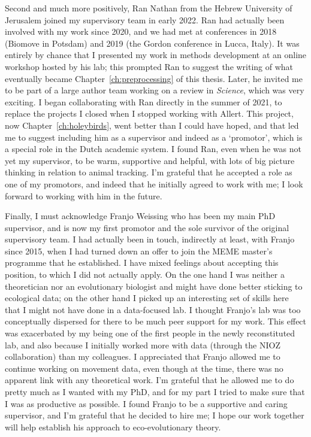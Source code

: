 Second and much more positively, Ran Nathan from the Hebrew University of Jerusalem joined my supervisory team in early 2022.
Ran had actually been involved with my work since 2020, and we had met at conferences in 2018 (Biomove in Potsdam) and 2019 (the Gordon conference in Lucca, Italy).
It was entirely by chance that I presented my work in methods development at an online workshop hosted by his lab; this prompted Ran to suggest the writing of what eventually became Chapter~\ref{ch:preprocessing} of this thesis.
Later, he invited me to be part of a large author team working on a review in \textit{Science}, which was very exciting.
I began collaborating with Ran directly in the summer of 2021, to replace the projects I closed when I stopped working with Allert.
This project, now Chapter~\ref{ch:holeybirds}, went better than I could have hoped, and that led me to suggest including him as a supervisor and indeed as a `promotor', which is a special role in the Dutch academic system.
I found Ran, even when he was not yet my supervisor, to be warm, supportive and helpful, with lots of big picture thinking in relation to animal tracking.
I'm grateful that he accepted a role as one of my promotors, and indeed that he initially agreed to work with me; I look forward to working with him in the future.

Finally, I must acknowledge Franjo Weissing who has been my main PhD supervisor, and is now my first promotor and the sole survivor of the original supervisory team.
I had actually been in touch, indirectly at least, with Franjo since 2015, when I had turned down an offer to join the MEME master's programme that he established.
I have mixed feelings about accepting this position, to which I did not actually apply.
On the one hand I was neither a theoretician nor an evolutionary biologist and might have done better sticking to ecological data; on the other hand I picked up an interesting set of skills here that I might not have done in a data-focused lab.
I thought Franjo's lab was too conceptually dispersed for there to be much peer support for my work.
This effect was exacerbated by my being one of the first people in the newly reconstituted lab, and also because I initially worked more with data (through the NIOZ collaboration) than my colleagues.
I appreciated that Franjo allowed me to continue working on movement data, even though at the time, there was no apparent link with any theoretical work.
I'm grateful that he allowed me to do pretty much as I wanted with my PhD, and for my part I tried to make sure that I was as productive as possible.
I found Franjo to be a supportive and caring supervisor, and I'm grateful that he decided to hire me; I hope our work together will help establish his approach to eco-evolutionary theory.

